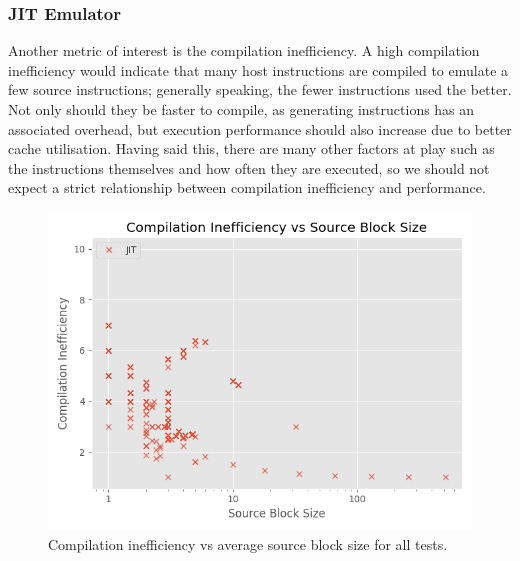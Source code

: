 \subsubsection{JIT Emulator}






Another metric of interest is the compilation inefficiency. A high compilation inefficiency would indicate that many host instructions are compiled to emulate a few source instructions; generally speaking, the fewer instructions used the better. Not only should they be faster to compile, as generating instructions has an associated overhead, but execution performance should also increase due to better cache utilisation. Having said this, there are many other factors at play such as the instructions themselves and how often they are executed, so we should not expect a strict relationship between compilation inefficiency and performance.

\begin{figure}[h]
    \centering
    \includegraphics[scale=0.75]{output/graphs/scatter/single/jit/c-efficiency-vs-hotness.png}
    \caption{Compilation inefficiency vs average source block size for all tests.}
    \label{figure:jit-c-inefficiency-size}
\end{figure}

